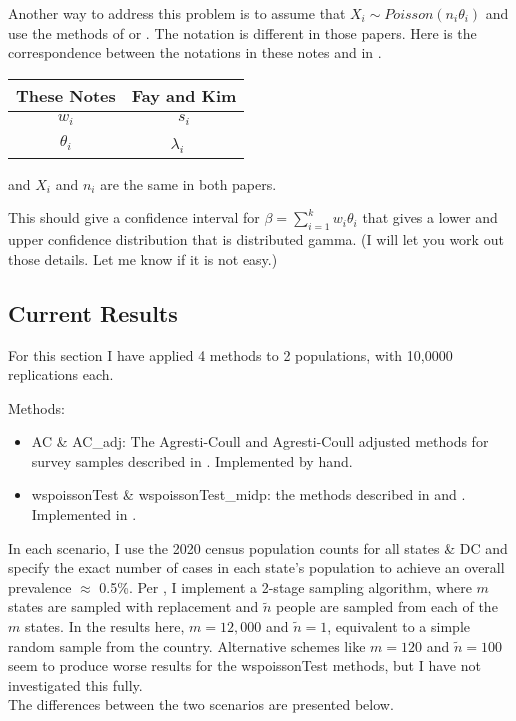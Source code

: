 \documentclass{article}
\begin{document}
Another way to address this problem is to assume that $X_i \sim Poisson( n_i \theta_i)$ and use the methods
of \citet{FayF:1997} or \citet{FayK:2017}.
The notation is different in those papers. Here is the correspondence between the notations in these notes and in \citet{FayK:2017}.

\begin{tabular}{cc}
These Notes & Fay and Kim  \\ \hline
$w_i$     & $s_i$ \\
$\theta_i$ & $\lambda_i$ \
\end{tabular}

and $X_i$ and $n_i$ are the same in both papers. 


This should give a confidence interval for $\beta=\sum_{i=1}^{k} w_i \theta_i$
that gives a lower and upper confidence distribution that is distributed gamma. (I will let you work out those details. Let me know if it is not easy.)

\subsection{Current Results}

For this section I have applied 4 methods to 2 populations, with 10,0000 replications each.

\noindent Methods:
\begin{itemize}
    \item AC \& AC\_adj: The Agresti-Coull and Agresti-Coull adjusted methods for survey samples described in \cite{Dean:2015}. Implemented by hand.
    \item wspoissonTest \& wspoissonTest\_midp: the methods described in \cite{FayF:1997} and \cite{FayK:2017}. Implemented in \cite{asht}.
\end{itemize}

In each scenario, I use the 2020 census population counts for all states \& DC and specify the exact number of cases in each state's population to achieve an overall prevalence $\approx$  0.5\%.
Per \cite{Lemeshow1985SurveysTM}, I implement a 2-stage sampling algorithm, where $m$ states are sampled with replacement and $\tilde{n}$ people are sampled from each of the $m$ states.
In the results here, $m = 12,000$ and $\tilde{n} = 1$, equivalent to a simple random sample from the country.
Alternative schemes like $m = 120$ and $\tilde{n} = 100$ seem to produce worse results for the wspoissonTest methods, but I have not investigated this fully.\\
The differences between the two scenarios are presented below.\\
\end{document}
